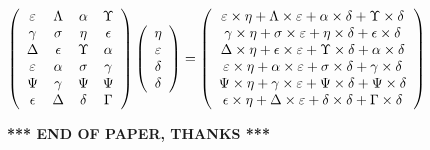 \documentclass[12pt]{article}
\begin{document}
$  %
 \left( \begin{array}
 {
 c
 c
 c
 c
 }
 \varepsilon & 
 \Lambda & 
 \alpha & 
 \Upsilon \\ 
 \gamma & 
 \sigma & 
 \eta & 
 \epsilon \\ 
 \Delta & 
 \epsilon & 
 \Upsilon & 
 \alpha \\ 
 \varepsilon & 
 \alpha & 
 \sigma & 
 \gamma \\ 
 \Psi & 
 \gamma & 
 \Psi & 
 \Psi \\ 
 \epsilon & 
 \Delta & 
 \delta & 
 \Gamma
 \end{array} \right)
 \left( \begin{array}
 {
 c
 }
 \eta \\ 
 \varepsilon \\ 
 \delta \\ 
 \delta
 \end{array} \right)
=
 \left( \begin{array}
 {
 c
 }
  \varepsilon \times  \eta +  \Lambda \times  \varepsilon +  \alpha \times  \delta +  \Upsilon \times  \delta \\ 
  \gamma \times  \eta +  \sigma \times  \varepsilon +  \eta \times  \delta +  \epsilon \times  \delta \\ 
  \Delta \times  \eta +  \epsilon \times  \varepsilon +  \Upsilon \times  \delta +  \alpha \times  \delta \\ 
  \varepsilon \times  \eta +  \alpha \times  \varepsilon +  \sigma \times  \delta +  \gamma \times  \delta \\ 
  \Psi \times  \eta +  \gamma \times  \varepsilon +  \Psi \times  \delta +  \Psi \times  \delta \\ 
  \epsilon \times  \eta +  \Delta \times  \varepsilon +  \delta \times  \delta +  \Gamma \times  \delta
 \end{array} \right)
$
 
 
 
 
 
\noindent{}

 
 
   
   
 \vspace{0.2in}
 
   
   
   
   
\vspace{1.0in} 
{\textbf{\large{ *** END OF PAPER, THANKS *** }}} 
   
\end{document}
